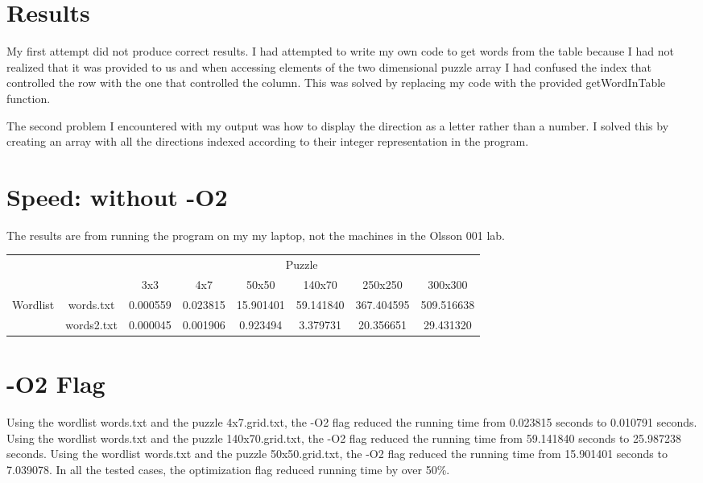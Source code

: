 \documentclass{article} %
\begin{document}
\section{Results}
My first attempt did not produce correct results. I had attempted to write my own code to get words from the table because I had not realized that it was provided to us and when accessing elements of the two dimensional puzzle array I had confused the index that controlled the row with the one that controlled the column. This was solved by replacing my code with the provided getWordInTable function.

The second problem I encountered with my output was how to display the direction as a letter rather than a number. I solved this by creating an array with all the directions indexed according to their integer representation in the program.

\section{Speed: without -O2}
The results are from running the program on my my laptop, not the machines in the Olsson 001 lab.
\begin{table}[h]
\begin{tabular}{cc|c|c|c|c|c|c|}
\cline{3-8}
                                                &            & \multicolumn{6}{c|}{Puzzle}                                           \\ \cline{3-8} 
                                                &            & 3x3      & 4x7      & 50x50     & 140x70    & 250x250    & 300x300    \\ \hline
\multicolumn{1}{|c|}{\multirow{2}{*}{Wordlist}} & words.txt  & 0.000559 & 0.023815 & 15.901401 & 59.141840 & 367.404595 & 509.516638 \\ \cline{2-8} 
\multicolumn{1}{|c|}{}                          & words2.txt & 0.000045 & 0.001906 & 0.923494  & 3.379731  & 20.356651  & 29.431320  \\ \hline
\end{tabular}
\end{table}

\section{-O2 Flag}
Using the wordlist words.txt and the puzzle 4x7.grid.txt, the -O2 flag reduced the running time from 0.023815 seconds to 0.010791 seconds. 
Using the wordlist words.txt and the puzzle 140x70.grid.txt, the -O2 flag reduced the running time from 59.141840 seconds to 25.987238 seconds. 
Using the wordlist words.txt and the puzzle 50x50.grid.txt, the -O2 flag reduced the running time from 15.901401 seconds to 7.039078.
In all the tested cases, the optimization flag reduced running time by over 50\%.
\end{document}
